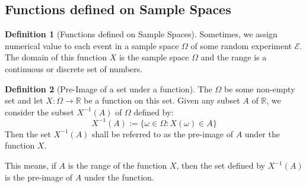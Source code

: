 \documentclass[11pt]{article}
\theoremstyle{definition}
\newtheorem{defn}{Definition}
\begin{document}
\subsection{Functions defined on Sample Spaces}

\begin{defn}[Functions defined on Sample Spaces]
Sometimes, we assign numerical value to each event in a sample space $\Omega$ of some random experiment $\mathcal{E}$. The domain of this function $X$ is the sample space $\Omega$ and the range is a continuous or discrete set of numbers.  
\end{defn}


\begin{defn}[Pre-Image of a set under a function]
The $\Omega$ be some non-empty set and let $X : \Omega \rightarrow \mathbb{R}$ be a function on this set. Given any subset $A$ of $\mathbb{R}$, we consider the subset $X^{-1}(A)$ of $\Omega$ defined by:
$$
X^{-1}(A) := \{\omega \in \Omega : X(\omega) \in A\}
$$
Then the set $X^{-1}(A)$ shall be referred to as the pre-image of $A$ under the function $X$.
\end{defn}
This means, if $A$ is the range of the function $X$, then the set defined by $X^{-1}(A)$ is the pre-image of $A$ under the function.
\end{document}

